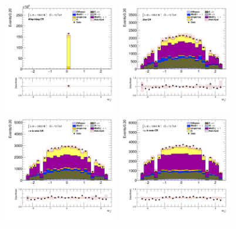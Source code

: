 		\begin{figure}[!htp]
			\begin{center}    
			\includegraphics[width=0.45\textwidth]{chapters/chapter6_HPlus/images/taulep/tau_0_eta_DILEP_BTAG.png}
			\includegraphics[width=0.45\textwidth]{chapters/chapter6_HPlus/images/taulep/tau_0_eta_ZEE.png} \\
			\includegraphics[width=0.45\textwidth]{chapters/chapter6_HPlus/images/taulep/tau_0_eta_TAUEL_BVETO.png} 
			\includegraphics[width=0.45\textwidth]{chapters/chapter6_HPlus/images/taulep/tau_0_eta_TAUMU_BVETO.png} \\

\end{center}
\end{figure}
